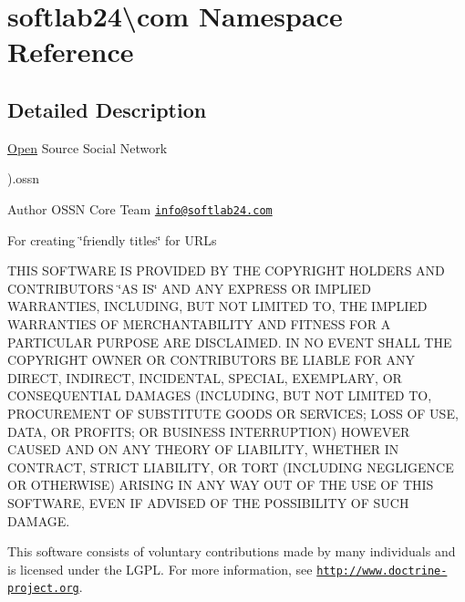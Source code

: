 \hypertarget{namespacesoftlab24_1_1com}{}\section{softlab24\textbackslash{}com Namespace Reference}
\label{namespacesoftlab24_1_1com}


\subsection{Detailed Description}
\hyperlink{namespace_open}{Open} Source Social Network

).ossn \begin{DoxyAuthor}{Author}
O\+S\+SN Core Team \href{mailto:info@softlab24.com}{\tt info@softlab24.\+com}
\end{DoxyAuthor}
For creating \char`\"{}friendly titles\char`\"{} for U\+R\+Ls

T\+H\+IS S\+O\+F\+T\+W\+A\+RE IS P\+R\+O\+V\+I\+D\+ED BY T\+HE C\+O\+P\+Y\+R\+I\+G\+HT H\+O\+L\+D\+E\+RS A\+ND C\+O\+N\+T\+R\+I\+B\+U\+T\+O\+RS \char`\"{}\+A\+S I\+S\char`\"{} A\+ND A\+NY E\+X\+P\+R\+E\+SS OR I\+M\+P\+L\+I\+ED W\+A\+R\+R\+A\+N\+T\+I\+ES, I\+N\+C\+L\+U\+D\+I\+NG, B\+UT N\+OT L\+I\+M\+I\+T\+ED TO, T\+HE I\+M\+P\+L\+I\+ED W\+A\+R\+R\+A\+N\+T\+I\+ES OF M\+E\+R\+C\+H\+A\+N\+T\+A\+B\+I\+L\+I\+TY A\+ND F\+I\+T\+N\+E\+SS F\+OR A P\+A\+R\+T\+I\+C\+U\+L\+AR P\+U\+R\+P\+O\+SE A\+RE D\+I\+S\+C\+L\+A\+I\+M\+ED. IN NO E\+V\+E\+NT S\+H\+A\+LL T\+HE C\+O\+P\+Y\+R\+I\+G\+HT O\+W\+N\+ER OR C\+O\+N\+T\+R\+I\+B\+U\+T\+O\+RS BE L\+I\+A\+B\+LE F\+OR A\+NY D\+I\+R\+E\+CT, I\+N\+D\+I\+R\+E\+CT, I\+N\+C\+I\+D\+E\+N\+T\+AL, S\+P\+E\+C\+I\+AL, E\+X\+E\+M\+P\+L\+A\+RY, OR C\+O\+N\+S\+E\+Q\+U\+E\+N\+T\+I\+AL D\+A\+M\+A\+G\+ES (I\+N\+C\+L\+U\+D\+I\+NG, B\+UT N\+OT L\+I\+M\+I\+T\+ED TO, P\+R\+O\+C\+U\+R\+E\+M\+E\+NT OF S\+U\+B\+S\+T\+I\+T\+U\+TE G\+O\+O\+DS OR S\+E\+R\+V\+I\+C\+ES; L\+O\+SS OF U\+SE, D\+A\+TA, OR P\+R\+O\+F\+I\+TS; OR B\+U\+S\+I\+N\+E\+SS I\+N\+T\+E\+R\+R\+U\+P\+T\+I\+ON) H\+O\+W\+E\+V\+ER C\+A\+U\+S\+ED A\+ND ON A\+NY T\+H\+E\+O\+RY OF L\+I\+A\+B\+I\+L\+I\+TY, W\+H\+E\+T\+H\+ER IN C\+O\+N\+T\+R\+A\+CT, S\+T\+R\+I\+CT L\+I\+A\+B\+I\+L\+I\+TY, OR T\+O\+RT (I\+N\+C\+L\+U\+D\+I\+NG N\+E\+G\+L\+I\+G\+E\+N\+CE OR O\+T\+H\+E\+R\+W\+I\+SE) A\+R\+I\+S\+I\+NG IN A\+NY W\+AY O\+UT OF T\+HE U\+SE OF T\+H\+IS S\+O\+F\+T\+W\+A\+RE, E\+V\+EN IF A\+D\+V\+I\+S\+ED OF T\+HE P\+O\+S\+S\+I\+B\+I\+L\+I\+TY OF S\+U\+CH D\+A\+M\+A\+GE.

This software consists of voluntary contributions made by many individuals and is licensed under the L\+G\+PL. For more information, see \href{http://www.doctrine-project.org}{\tt http\+://www.\+doctrine-\/project.\+org}.

